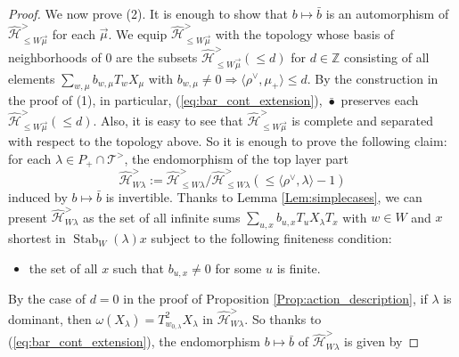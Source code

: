 \documentclass{amsart}
\newcommand{\Z}{\mathbb{Z}}
\theoremstyle{definition}
\numberwithin{equation}{section}
\begin{document}
\begin{proof}
We now prove (2). It is enough to show that $b\mapsto \bar{b}$ is an automorphism of
$\widehat{\mathcal{H}}^>_{\leqslant W\vec{\mu}}$ for each $\vec{\mu}$. We equip $\widehat{\mathcal{H}}^>_{\leqslant W\vec{\mu}}$
with the topology whose basis of neighborhoods of $0$ are the subsets $\widehat{\mathcal{H}}^>_{\leqslant W\vec{\mu}}(\leqslant d)$ for $d\in \Z$ consisting of all elements $\sum_{w,\mu}b_{w,\mu}T_w X_\mu$ with 
$b_{w,\mu}\neq 0\Rightarrow \langle\rho^\vee,\mu_+\rangle\leqslant d$. By the construction in the proof of (1), in particular, (\ref{eq:bar_cont_extension}), $\bar{\bullet}$ preserves each $\widehat{\mathcal{H}}^>_{\leqslant W\vec{\mu}}(\leqslant d)$. Also, it is easy to see that 
$\widehat{\mathcal{H}}^>_{\leqslant W\vec{\mu}}$ is complete and separated with respect to the topology above. So it is enough to prove the following claim: for each $\lambda\in P_+\cap \mathcal{T}^>$, the endomorphism of the top layer part
$$\widehat{\mathcal{H}}^>_{W\lambda}:=
\widehat{\mathcal{H}}^>_{\leqslant W\lambda}/ 
\widehat{\mathcal{H}}^>_{\leqslant W\lambda}(\leqslant \langle\rho^\vee,\lambda\rangle-1)$$ induced by $b\mapsto \bar{b}$
is invertible. 
Thanks to Lemma \ref{Lem:simplecases}, we can present $\widehat{\mathcal{H}}^>_{ W\lambda}$ 
as the set of all infinite sums $\sum_{u,x}b_{u,x} T_u X_\lambda T_x$ with $w\in W$ and $x$ shortest in $\operatorname{Stab}_W(\lambda)x$ subject to the following finiteness condition:
\begin{itemize}
\item  the set of all $x$ such that $b_{u,x}\neq 0$ for some $u$ is finite. 
\end{itemize}


By the case of $d=0$ in the proof of Proposition \ref{Prop:action_description}, if $\lambda$ is dominant, then 
$\omega(X_\lambda)=T_{w_{0,\lambda}}^2 X_\lambda$ in $\widehat{\mathcal{H}}^>_{W\lambda}$. So thanks to (\ref{eq:bar_cont_extension}),
the endomorphism $b\mapsto \bar{b}$ of $\widehat{\mathcal{H}}^>_{W\lambda}$ is given by 


\end{proof}
\end{document}
